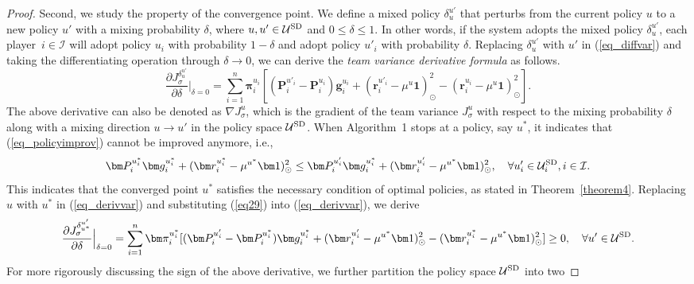 \documentclass[12pt]{article}
\begin{document}
\begin{proof}
Second, we study the property of the convergence point. We define a
mixed policy $\delta^{u'}_{u}$ that perturbs from the current policy
$u$ to a new policy $u'$ with a mixing probability $\delta$, where
$u,u' \in \mathcal U^{\rm SD}$ and $0\leq \delta \leq 1$. In other
words, if the system adopts the mixed policy $\delta^{u'}_{u}$, each
player~$i \in \mathcal I$ will adopt policy $u_i$ with probability
$1-\delta$ and adopt policy $u'_i$ with probability $\delta$.
Replacing $\delta^{u'}_{u}$ with $u'$ in (\ref{eq_diffvar}) and
taking the differentiating operation through $\delta \rightarrow 0$,
we can derive the \emph{team variance derivative formula} as
follows.
\begin{equation}\label{eq_derivvar}
\frac{\partial J^{\delta^{u'}_{u}}_{\sigma}}{\partial \delta}
\Big|_{\delta=0} = \sum_{i=1}^{n} \bm \pi^{u_i}_i[(\bm P^{u'_i}_i -
\bm P^{u_i}_i)\bm g^{u_i}_i + (\bm r^{u'_i}_i - \mu^u \bm
1)^2_{\odot} - (\bm r^{u_i}_i - \mu^u \bm 1)^2_{\odot}].
\end{equation}
The above derivative can also be denoted as $\nabla J^{u}_{\sigma}$,
which is the gradient of the team variance $J^{u}_{\sigma}$ with
respect to the mixing probability $\delta$ along with a mixing
direction $u \rightarrow u'$ in the policy space $\mathcal U^{\rm
SD}$. When Algorithm~1 stops at a policy, say $u^*$, it indicates
that (\ref{eq_policyimprov}) cannot be improved anymore, i.e.,
\begin{equation}\label{eq29}
\bm P^{u^*_i}_i \bm g^{u^*_i}_i + (\bm r^{u^*_i}_i - \mu^{u^*} \bm
1)^2_{\odot} \leq \bm P^{u'_i}_i \bm g^{u^*_i}_i + (\bm r^{u'_i}_i -
\mu^{u^*} \bm 1)^2_{\odot}, \quad \forall u'_i \in \mathcal U^{\rm
SD}_i, i \in \mathcal I.
\end{equation}
This indicates that the converged point $u^*$ satisfies the
necessary condition of optimal policies, as stated in
Theorem~\ref{theorem4}. Replacing $u$ with $u^*$ in
(\ref{eq_derivvar}) and substituting (\ref{eq29}) into
(\ref{eq_derivvar}), we derive
\begin{equation}\label{eq30}
\frac{\partial J^{\delta^{u'}_{u^*}}_{\sigma}}{\partial \delta}
\Big|_{\delta=0} = \sum_{i=1}^{n} \bm \pi^{u^*_i}_i[(\bm P^{u'_i}_i
- \bm P^{u^*_i}_i)\bm g^{u^*_i}_i + (\bm r^{u'_i}_i - \mu^{u^*} \bm
1)^2_{\odot} - (\bm r^{u^*_i}_i - \mu^{u^*} \bm 1)^2_{\odot}] \geq
0, \quad \forall u' \in \mathcal U^{\rm SD}.
\end{equation}
For more rigorously discussing the sign of the above derivative, we
further partition the policy space $\mathcal U^{\rm SD}$ into two

\end{proof}
\end{document}
